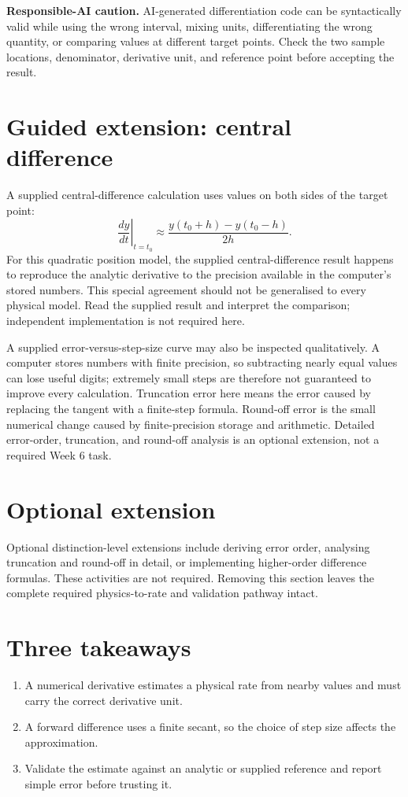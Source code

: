 \documentclass[11pt,a4paper]{article}
\begin{document}
\begin{aibox}\textbf{Responsible-AI caution.} AI-generated differentiation code can be syntactically valid while using the wrong interval, mixing units, differentiating the wrong quantity, or comparing values at different target points. Check the two sample locations, denominator, derivative unit, and reference point before accepting the result.\end{aibox}

\section*{Guided extension: central difference}
A supplied central-difference calculation uses values on both sides of the target point:
\[
\left.\frac{dy}{dt}\right|_{t=t_0}
\approx
\frac{y(t_0+h)-y(t_0-h)}{2h}.
\]
For this quadratic position model, the supplied central-difference result happens to reproduce the analytic derivative to the precision available in the computer's stored numbers. This special agreement should not be generalised to every physical model. Read the supplied result and interpret the comparison; independent implementation is not required here.

A supplied error-versus-step-size curve may also be inspected qualitatively. A computer stores numbers with finite precision, so subtracting nearly equal values can lose useful digits; extremely small steps are therefore not guaranteed to improve every calculation. Truncation error here means the error caused by replacing the tangent with a finite-step formula. Round-off error is the small numerical change caused by finite-precision storage and arithmetic. Detailed error-order, truncation, and round-off analysis is an optional extension, not a required Week 6 task.

\section*{Optional extension}
Optional distinction-level extensions include deriving error order, analysing truncation and round-off in detail, or implementing higher-order difference formulas. These activities are not required. Removing this section leaves the complete required physics-to-rate and validation pathway intact.

\section*{Three takeaways}
\begin{enumerate}[nosep,leftmargin=6mm]
\item A numerical derivative estimates a physical rate from nearby values and must carry the correct derivative unit.
\item A forward difference uses a finite secant, so the choice of step size affects the approximation.
\item Validate the estimate against an analytic or supplied reference and report simple error before trusting it.
\end{enumerate}
\end{document}
